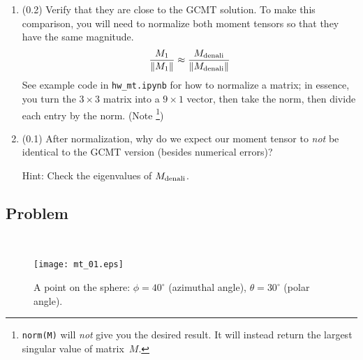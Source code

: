 \documentclass[11pt,titlepage,fleqn]{article}
\newcommand{\Mmat}{M}
\begin{document}
\begin{enumerate}
\begin{enumerate}
\item (0.2) Verify that they are close to the GCMT solution. To make this comparison, you will need to normalize both moment tensors so that they have the same magnitude.
%
\begin{equation}
\frac{\Mmat_1}{\|\Mmat_1\|} \approx \frac{\Mmat_{\rm denali} }{\|\Mmat_{\rm denali}\|}
\end{equation}
%
See example code in \verb+hw_mt.ipynb+ for how to normalize a matrix; in essence, you turn the $3 \times 3$ matrix into a $9 \times 1$ vector, then take the norm, then divide each entry by the norm. (Note \footnote{{\tt norm(M)} will {\em not} give you the desired result. It will instead return the largest singular value of matrix~$\Mmat$.})

\item (0.1) After normalization, why do we expect our moment tensor to {\em not} be identical to the GCMT version (besides numerical errors)?

Hint: Check the eigenvalues of $\Mmat_{\rm denali}$.


\end{enumerate}

\end{enumerate}


\subsection*{Problem} \howmuchtime\



\begin{figure}[h]
\centering
\texttt{[image: mt\_01.eps]}
\caption[]
{{
A point on the sphere: $\phi = 40^\circ$ (azimuthal angle), $\theta = 30^\circ$ (polar angle).
\label{fig:globe}
}}
\end{figure}
\end{document}
